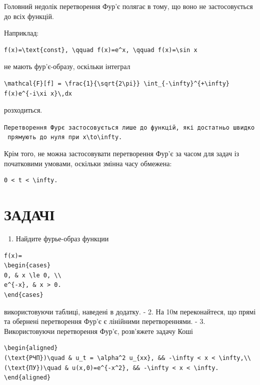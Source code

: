 \documentclass[
  ukrainian,
]{article}
\providecommand{\tightlist}{%
  \setlength{\itemsep}{0pt}\setlength{\parskip}{0pt}}
\begin{document}
Головний недолік перетворення Фур'є полягає в тому, що воно не
застосовується до всіх функцій.

Наприклад:

\begin{verbatim}
f(x)=\text{const}, \qquad f(x)=e^x, \qquad f(x)=\sin x
\end{verbatim}

не мають фур'є-образу, оскільки інтеграл

\begin{verbatim}
\mathcal{F}[f] = \frac{1}{\sqrt{2\pi}} \int_{-\infty}^{+\infty} f(x)e^{-i\xi x}\,dx
\end{verbatim}

розходиться.

\texttt{Перетворення\ Фур\textquotesingle{}є\ застосовується\ лише\ до\ функцій,\ які\ достатньо\ швидко\ прямують\ до\ нуля\ при\ \textquotesingle{}\textbar{}x\textbar{}\textbackslash{}to\textbackslash{}infty\textquotesingle{}.}

Крім того, не можна застосовувати перетворення Фур'є за часом для задач
із початковими умовами, оскільки змінна часу обмежена:

\begin{verbatim}
0 < t < \infty.
\end{verbatim}

\section{ЗАДАЧІ}\label{ux437ux430ux434ux430ux447ux456-1}

\begin{enumerate}
\def\labelenumi{\arabic{enumi}.}
\tightlist
\item
  Найдите фурье-образ функции
\end{enumerate}

\begin{verbatim}
f(x)=
\begin{cases}
0, & x \le 0, \\
e^{-x}, & x > 0.
\end{cases}
\end{verbatim}

використовуючи таблиці, наведені в додатку. - 2. На 10м переконайтеся,
що прямі та обернені перетворення Фур'є є лінійними перетвореннями. - 3.
Використовуючи перетворення Фур'є, розв'яжете задачу Коші

\begin{verbatim}
\begin{aligned}
(\text{РЧП})\quad & u_t = \alpha^2 u_{xx}, && -\infty < x < \infty,\\
(\text{ПУ})\quad & u(x,0)=e^{-x^2}, && -\infty < x < \infty.
\end{aligned}
\end{verbatim}
\end{document}
